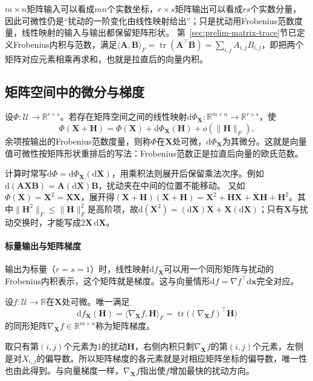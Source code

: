 $m\times n$矩阵输入可以看成$mn$个实数坐标，$r\times s$矩阵输出可以看成$rs$个实数分量，因此可微性仍是“扰动的一阶变化由线性映射给出”；只是扰动用Frobenius范数度量，线性映射的输入与输出都保留矩阵形状。
第~\ref{sec:prelim-matrix-trace}节已定义Frobenius内积与范数，满足$\langle\bm A,\bm B\rangle_F=\operatorname{tr}(\bm A^\top\bm B)=\sum_{i,j}A_{i,j}B_{i,j}$，即把两个矩阵对应元素相乘再求和，也就是拉直后的向量内积。

\subsection{矩阵空间中的微分与梯度}
设$\Phi:\mathcal U\to\mathbb R^{r\times s}$。若存在矩阵空间之间的线性映射$\mathrm d\Phi_{\bm X}:\mathbb R^{m\times n}\to\mathbb R^{r\times s}$，使
\[
 \Phi(\bm X+\bm H)=\Phi(\bm X)+\mathrm d\Phi_{\bm X}(\bm H)+o(\lVert\bm H\rVert_F),
\]
余项按输出的Frobenius范数度量，则称$\Phi$在$\bm X$处可微，$\mathrm d\Phi_{\bm X}$为其微分。这就是向量值可微性按矩阵形状重排后的写法：Frobenius范数正是拉直后向量的欧氏范数。

计算时常写$\mathrm d\Phi=\mathrm d\Phi_{\bm X}(\mathrm d\bm X)$，用乘积法则展开后保留乘法次序。例如$\mathrm d(\bm A\bm X\bm B)=\bm A(\mathrm d\bm X)\bm B$，扰动夹在中间的位置不能移动。
又如$\Phi(\bm X)=\bm X^2=\bm X\bm X$，展开得$(\bm X+\bm H)(\bm X+\bm H)=\bm X^2+\bm H\bm X+\bm X\bm H+\bm H^2$。其中$\lVert\bm H^2\rVert_F\leq\lVert\bm H\rVert_F^2$是高阶项，故$\mathrm d(\bm X^2)=(\mathrm d\bm X)\bm X+\bm X(\mathrm d\bm X)$；只有$\bm X$与扰动交换时，才能写成$2\bm X\,\mathrm d\bm X$。

\paragraph{标量输出与矩阵梯度}
输出为标量（$r=s=1$）时，线性映射$\mathrm df_{\bm X}$可以用一个同形矩阵与扰动的Frobenius内积表示，这个矩阵就是梯度。这与向量情形$\mathrm df=\nabla f^\top\mathrm d\bm x$完全对应。
\begin{definition}[矩阵标量函数的梯度]
\label{def:multivariable-matrix-scalar-gradient}
设$f:\mathcal U\to\mathbb R$在$\bm X$处可微。唯一满足
\begin{equation}
 \mathrm df_{\bm X}(\bm H)=\langle\nabla_{\bm X}f,\bm H\rangle_F
 =\operatorname{tr}\bigl((\nabla_{\bm X}f)^\top\bm H\bigr)
\label{eq:analysis-matrix-gradient-definition}
\end{equation}
的同形矩阵$\nabla_{\bm X}f\in\mathbb R^{m\times n}$称为矩阵梯度。
\end{definition}
取只有第$(i,j)$个元素为$1$的扰动$\bm H$，右侧内积只剩$\nabla_{\bm X}f$的第$(i,j)$个元素，左侧是对$X_{i,j}$的偏导数。所以矩阵梯度的各元素就是对相应矩阵坐标的偏导数，唯一性也由此得到。与向量梯度一样，$\nabla_{\bm X}f$指出使$f$增加最快的扰动方向。

